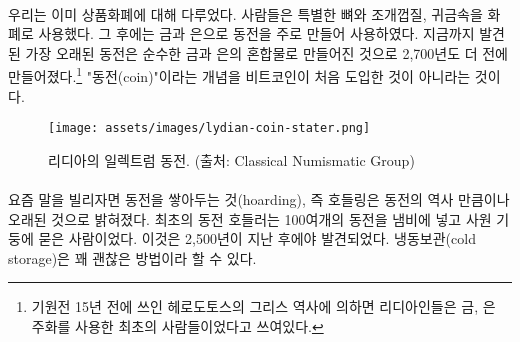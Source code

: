 \paragraph{}
\begin{comment}
	We already touched on commodity money above. People used special bones,
	seashells, and precious metals as money. Later on, mainly coins made out of
	precious metals like gold and silver were used as money. The oldest coin found
	so far is made of a natural gold-and-silver mix and was made more than 2700
	years ago.\footnote{According to the Greek historian Herodotus, writing in the
		fifth century BC, the Lydians were the first people to have used gold and silver
		coinage. \cite{coinage-origins}} If something is new in Bitcoin, the concept of
	a coin is not it.
\end{comment}
우리는 이미 상품화폐에 대해 다루었다. 
사람들은 특별한 뼈와 조개껍질, 귀금속을 화폐로 사용했다. 
그 후에는 금과 은으로 동전을 주로 만들어 사용하였다.
지금까지 발견된 가장 오래된 동전은 순수한 금과 은의 혼합물로 만들어진 것으로 2,700년도 더 전에 만들어졌다.\footnote{기원전 15년 전에 쓰인 헤로도토스의 그리스 역사에 의하면 리디아인들은 금, 은 주화를 사용한 최초의 사람들이었다고 쓰여있다.\cite{coinage-origins}}
"동전(coin)"이라는 개념을 비트코인이 처음 도입한 것이 아니라는 것이다.

\newpage

\begin{figure}
	\centering
	\texttt{[image: assets/images/lydian-coin-stater.png]}
	\caption{리디아의 일렉트럼 동전. (출처: Classical Numismatic Group)}
	\label{fig:lydian-coin-stater}
\end{figure}

\paragraph{}
\begin{comment}
	Turns out that hoarding coins, or hodling, to use today's parlance, is
	almost as old as coins. The earliest coin hodler was someone who put
	almost a hundred of these coins in a pot and buried it in the
	foundations of a temple, only to be found 2500 years later. Pretty good
	cold storage if you ask me.
\end{comment}
요즘 말을 빌리자면 동전을 쌓아두는 것(hoarding), 즉 호들링은 동전의 역사 만큼이나 오래된 것으로 밝혀졌다. 
최초의 동전 호들러는 100여개의 동전을 냄비에 넣고 사원 기둥에 묻은 사람이었다. 
이것은 2,500년이 지난 후에야 발견되었다. 냉동보관(cold storage)은 꽤 괜찮은 방법이라 할 수 있다.

